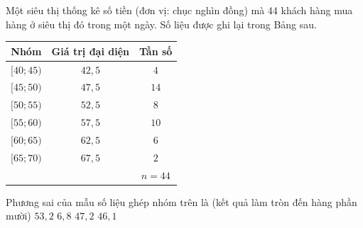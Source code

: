 \begin{ex}%
	Một siêu thị  thống kê số tiền (đơn vị: chục nghìn đồng) mà 44 khách hàng mua hàng ở siêu thị đó trong một ngày. Số liệu được ghi lại trong Bảng sau.
	\begin{center}
		\begin{tabular}{|c|c|c|}
			\hline 
			Nhóm & Giá  trị đại diện & Tần số \\
			 \hline
			$[40;45)$  & $42{,}5$ & $4$ \\
			\hline 
			$[45;50)$ & $47{,}5$  & $14$ \\
			\hline 
			$[50;55)$ &  $52{,}5$ & $8$ \\
			\hline 
			$[55;60)$ & $57{,}5$  & $10$ \\
			\hline 
			$[60;65)$ & $62{,}5$ & $6$ \\ 
			\hline 
			$[65;70)$ & $67{,}5$ &  $2$ \\
			 \hline
			 & & $n=44$ \\
			\hline 
		\end{tabular}
	\end{center}
	 Phương sai của mẫu số liệu ghép nhóm trên là (kết quả làm tròn đến hàng phần mười)
	 \choice
		{$53{,}2$} 
		 {$6{,}8$}
		{$47{,}2$} 
		{\True $46{,}1$} 
\end{ex}

